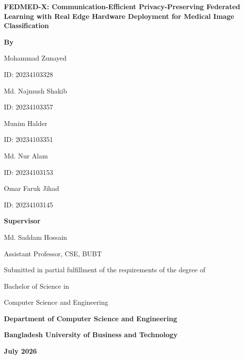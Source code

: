 \documentclass[12pt,a4paper]{report}
\begin{document}
\begin{titlepage}
    \centering
    \vspace*{2cm}
    
    {\fontsize{18}{22}\selectfont \textbf{FEDMED-X: Communication-Efficient Privacy-Preserving Federated Learning with Real Edge Hardware Deployment for Medical Image Classification}\par}
    
    \vspace{2cm}
    
    \textbf{By}\par
    \vspace{1cm}
    
    Mohammad Zunayed\par
    ID: 20234103328\par\vspace{0.5cm}
    
    Md. Najmush Shakib\par
    ID: 20234103357\par\vspace{0.5cm}
    
    Munim Halder\par
    ID: 20234103351\par\vspace{0.5cm}
    
    Md. Nur Alam\par
    ID: 20234103153\par\vspace{0.5cm}
    
    Omar Faruk Jihad\par
    ID: 20234103145\par
    
    \vspace{2cm}
    
    \textbf{Supervisor}\par
    Md. Saddam Hossain\par
    Assistant Professor, CSE, BUBT\par
    
    \vfill
    
    Submitted in partial fulfillment of the requirements of the degree of\par
    Bachelor of Science in\par
    Computer Science and Engineering\par
    
    \vspace{1cm}
    
    \textbf{Department of Computer Science and Engineering}\par
    \textbf{Bangladesh University of Business and Technology}\par
    \textbf{July 2026}
\end{titlepage}
\end{document}
